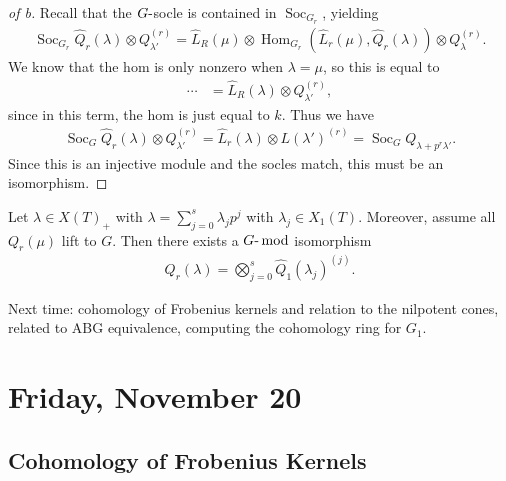 \begin{proof}[of b]

Recall that the \(G{\hbox{-}}\)socle is contained in
\(\operatorname{Soc}_{G_r}\), yielding
\begin{align*}  
\operatorname{Soc}_{G_r} \widehat{Q}_r(\lambda) \otimes Q_{\lambda'}^{(r)} 
= \widehat{L}_R(\mu) \otimes{\operatorname{Hom}}_{G_r}( \widehat{L}_r(\mu), \widehat{Q}_r(\lambda)  ) \otimes Q_{\lambda}^{(r)}
.\end{align*}
We know that the hom is only nonzero when \(\lambda = \mu\), so this is
equal to
\begin{align*}  
\cdots
&= \widehat{L}_R(\lambda) \otimes Q_{\lambda'}^{(r)}
,\end{align*}
since in this term, the hom is just equal to \(k\). Thus we have
\begin{align*}  
\operatorname{Soc}_G \widehat{Q}_r(\lambda) \otimes Q_{\lambda'}^{(r)}
= \widehat{L}_r(\lambda) \otimes L(\lambda')^{(r)} = \operatorname{Soc}_G Q_{\lambda+ p^r \lambda'}
.\end{align*}
Since this is an injective module and the socles match, this must be an
isomorphism.

\end{proof}

\begin{corollary}[?]

Let \(\lambda \in X(T)_+\) with \(\lambda = \sum_{j=0}^s \lambda_j p^j\)
with \(\lambda_j \in X_1(T)\). Moreover, assume all \(Q_r(\mu)\) lift to
\(G\). Then there exists a \({{G}{\hbox{-}}\operatorname{mod}}\)
isomorphism
\begin{align*}  
Q_r(\lambda) = \bigotimes_{j=0}^s \widehat{Q}_1(\lambda_j)^{(j)}
.\end{align*}

\end{corollary}

Next time: cohomology of Frobenius kernels and relation to the nilpotent
cones, related to ABG equivalence, computing the cohomology ring for
\(G_1\).

\hypertarget{friday-november-20}{%
\section{Friday, November 20}\label{friday-november-20}}

\hypertarget{cohomology-of-frobenius-kernels}{%
\subsection{Cohomology of Frobenius
Kernels}\label{cohomology-of-frobenius-kernels}}

